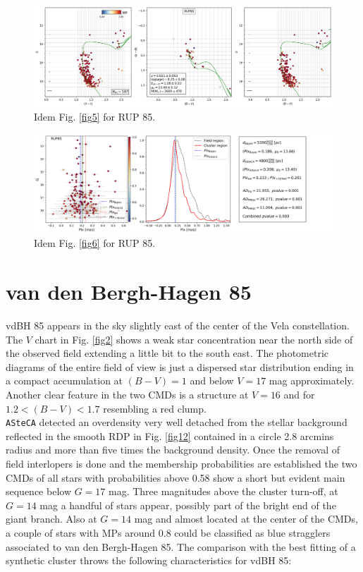 \documentclass[draft]{aa}
\begin{document}
\begin{figure}[ht]
    \centering
    \includegraphics[width=\hsize]{../figs/cmds_rup85.png}
    \caption{Idem Fig. \ref{fig5} for RUP 85.}
    \label{fig9}
\end{figure}

\begin{figure}[ht]
    \centering
    \includegraphics[width=\hsize]{../figs/plx_RUP85.png}
    \caption{Idem Fig. \ref{fig6} for RUP 85.}
    \label{fig10}
\end{figure}



\section{van den Bergh-Hagen 85}

vdBH 85 appears in the sky slightly east of the center of the
Vela constellation. The $V$ chart in Fig. \ref{fig2} shows a weak star
concentration near the north side of the observed field extending a little bit
to the south east. The photometric diagrams of the entire field of view is just
a dispersed star distribution ending in a compact accumulation at $(B-V)=1$ and
below $V = 17$ mag approximately. Another clear feature in the two CMDs is a
structure at $V = 16$ and for $1.2 < (B-V) < 1.7$ resembling a red clump.\\

\texttt{ASteCA} detected an overdensity very well detached from the stellar
background reflected in the smooth RDP in Fig. \ref{fig12} contained in a circle
2.8 arcmins radius and more than five times the background density. Once the
removal of field interlopers is done and the membership probabilities are
established the two CMDs of all stars with probabilities above 0.58 show a
short but evident main sequence below $G=17$ mag.
Three magnitudes above the cluster turn-off, at $G=14$ mag a handful of stars
appear, possibly part of the bright end of the giant branch. Also at
$G=14$ mag and almost located at the center of the CMDs, a couple of stars with
MPs around 0.8 could be classified as blue stragglers associated to van den
Bergh-Hagen 85.
The comparison with the best fitting of a synthetic cluster throws the
following characteristics for vdBH 85:
\end{document}

